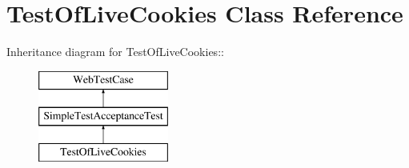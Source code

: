 \hypertarget{class_test_of_live_cookies}{
\section{TestOfLiveCookies Class Reference}
\label{class_test_of_live_cookies}
}
Inheritance diagram for TestOfLiveCookies::\begin{figure}[H]
\begin{center}
\leavevmode
\includegraphics[height=3cm]{class_test_of_live_cookies}
\end{center}
\end{figure}
